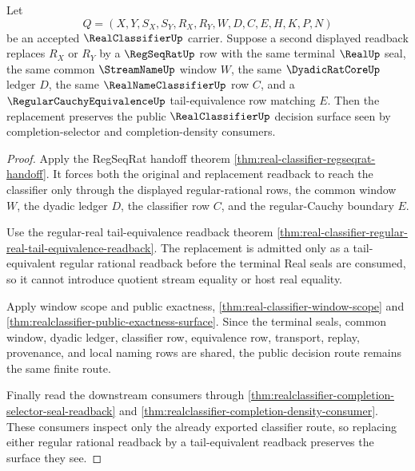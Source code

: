 \begin{theorem}
\label{thm:realclassifier-tail-replacement-stability}
Let
$$
Q=(X,Y,S_X,S_Y,R_X,R_Y,W,D,C,E,H,K,P,N)
$$
be an accepted $\RealClassifierUp$ carrier. Suppose a second displayed readback replaces $R_X$ or $R_Y$ by a $\RegSeqRatUp$ row with the same terminal $\RealUp$ seal, the same common $\StreamNameUp$ window $W$, the same $\DyadicRatCoreUp$ ledger $D$, the same $\RealNameClassifierUp$ row $C$, and a $\RegularCauchyEquivalenceUp$ tail-equivalence row matching $E$. Then the replacement preserves the public $\RealClassifierUp$ decision surface seen by completion-selector and completion-density consumers.
\end{theorem}
\begin{proof}
Apply the RegSeqRat handoff theorem \autoref{thm:real-classifier-regseqrat-handoff}. It forces both the original and replacement readback to reach the classifier only through the displayed regular-rational rows, the common window $W$, the dyadic ledger $D$, the classifier row $C$, and the regular-Cauchy boundary $E$.

Use the regular-real tail-equivalence readback theorem \autoref{thm:real-classifier-regular-real-tail-equivalence-readback}. The replacement is admitted only as a tail-equivalent regular rational readback before the terminal Real seals are consumed, so it cannot introduce quotient stream equality or host real equality.

Apply window scope and public exactness, \autoref{thm:real-classifier-window-scope} and \autoref{thm:realclassifier-public-exactness-surface}. Since the terminal seals, common window, dyadic ledger, classifier row, equivalence row, transport, replay, provenance, and local naming rows are shared, the public decision route remains the same finite route.

Finally read the downstream consumers through \autoref{thm:realclassifier-completion-selector-seal-readback} and \autoref{thm:realclassifier-completion-density-consumer}. These consumers inspect only the already exported classifier route, so replacing either regular rational readback by a tail-equivalent readback preserves the surface they see.
\end{proof}

